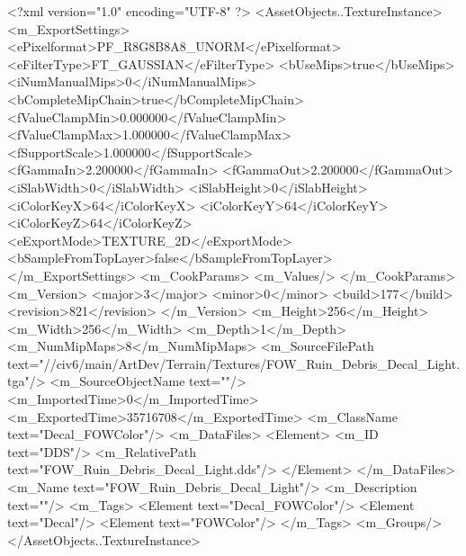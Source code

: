 <?xml version="1.0" encoding="UTF-8" ?>
<AssetObjects..TextureInstance>
	<m_ExportSettings>
		<ePixelformat>PF_R8G8B8A8_UNORM</ePixelformat>
		<eFilterType>FT_GAUSSIAN</eFilterType>
		<bUseMips>true</bUseMips>
		<iNumManualMips>0</iNumManualMips>
		<bCompleteMipChain>true</bCompleteMipChain>
		<fValueClampMin>0.000000</fValueClampMin>
		<fValueClampMax>1.000000</fValueClampMax>
		<fSupportScale>1.000000</fSupportScale>
		<fGammaIn>2.200000</fGammaIn>
		<fGammaOut>2.200000</fGammaOut>
		<iSlabWidth>0</iSlabWidth>
		<iSlabHeight>0</iSlabHeight>
		<iColorKeyX>64</iColorKeyX>
		<iColorKeyY>64</iColorKeyY>
		<iColorKeyZ>64</iColorKeyZ>
		<eExportMode>TEXTURE_2D</eExportMode>
		<bSampleFromTopLayer>false</bSampleFromTopLayer>
	</m_ExportSettings>
	<m_CookParams>
		<m_Values/>
	</m_CookParams>
	<m_Version>
		<major>3</major>
		<minor>0</minor>
		<build>177</build>
		<revision>821</revision>
	</m_Version>
	<m_Height>256</m_Height>
	<m_Width>256</m_Width>
	<m_Depth>1</m_Depth>
	<m_NumMipMaps>8</m_NumMipMaps>
	<m_SourceFilePath text="//civ6/main/ArtDev/Terrain/Textures/FOW_Ruin_Debris_Decal_Light.tga"/>
	<m_SourceObjectName text=""/>
	<m_ImportedTime>0</m_ImportedTime>
	<m_ExportedTime>35716708</m_ExportedTime>
	<m_ClassName text="Decal_FOWColor"/>
	<m_DataFiles>
		<Element>
			<m_ID text="DDS"/>
			<m_RelativePath text="FOW_Ruin_Debris_Decal_Light.dds"/>
		</Element>
	</m_DataFiles>
	<m_Name text="FOW_Ruin_Debris_Decal_Light"/>
	<m_Description text=""/>
	<m_Tags>
		<Element text="Decal_FOWColor"/>
		<Element text="Decal"/>
		<Element text="FOWColor"/>
	</m_Tags>
	<m_Groups/>
</AssetObjects..TextureInstance>

